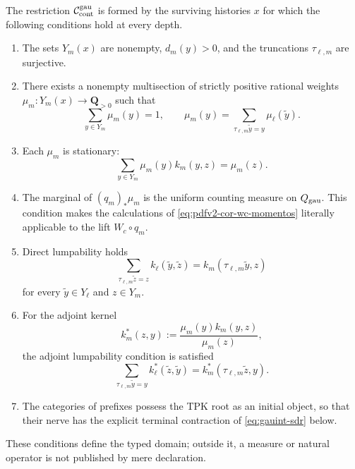The restriction \(\mathcal C_{\rm cont}^{\rm gau}\) is formed by the
surviving histories \(x\) for which the following conditions
hold at every depth.
\begin{enumerate}
 \item The sets \(Y_m(x)\) are nonempty, \(d_m(y)>0\), and the
 truncations \(\tau_{\ell,m}\) are surjective.
 \item There exists a nonempty multisection of strictly positive rational
 weights \(\mu_m:Y_m(x)\to\mathbf Q_{>0}\) such that
 \begin{equation}\label{eq:gauint-medida-proyectiva}
  \sum_{y\in Y_m}\mu_m(y)=1,
  \qquad
  \mu_m(y)=\sum_{\tau_{\ell,m}\widetilde y=y}\mu_\ell(\widetilde y).
 \end{equation}
 \item Each \(\mu_m\) is stationary:
 \begin{equation}\label{eq:gauint-estacionariedad}
  \sum_{y\in Y_m}\mu_m(y)k_m(y,z)=\mu_m(z).
 \end{equation}
 \item The marginal of \((q_m)_*\mu_m\) is the uniform counting measure on
 \(Q_{\rm gau}\). This condition makes the calculations
 of \eqref{eq:pdfv2-cor-wc-momentos} literally applicable to the lift \(W_c\circ q_m\).
 \item Direct lumpability holds
 \begin{equation}\label{eq:gauint-lump-directa}
  \sum_{\tau_{\ell,m}\widetilde z=z}
   k_\ell(\widetilde y,\widetilde z)
  =k_m(\tau_{\ell,m}\widetilde y,z)
 \end{equation}
 for every \(\widetilde y\in Y_\ell\) and \(z\in Y_m\).
 \item For the adjoint kernel
 \begin{equation}\label{eq:gauint-kernel-adjunto}
  k_m^*(z,y):=\frac{\mu_m(y)k_m(y,z)}{\mu_m(z)},
 \end{equation}
 the adjoint lumpability condition is satisfied
 \begin{equation}\label{eq:gauint-lump-adjunta}
  \sum_{\tau_{\ell,m}\widetilde y=y}
   k_\ell^*(\widetilde z,\widetilde y)
  =k_m^*(\tau_{\ell,m}\widetilde z,y).
 \end{equation}
 \item The categories of prefixes possess the TPK root as an initial object,
 so that their nerve has the explicit terminal contraction of
 \eqref{eq:gauint-sdr} below.
\end{enumerate}
These conditions define the typed domain; outside it, a measure or natural
operator is not published by mere declaration.

